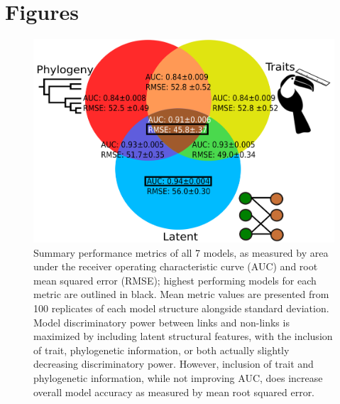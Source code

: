 \documentclass[openacc]{rsproca_new}%
\begin{document}
\section*{Figures}
\begin{figure}[!h]%
\centering
\includegraphics[width=\linewidth]{../Figs/ReplicatePerformance.png}
\caption{Summary performance metrics of all 7 models, as measured by area under the receiver operating characteristic curve (AUC) and root mean squared error (RMSE); highest performing models for each metric are outlined in black. Mean metric values are presented from 100 replicates of each model structure alongside standard deviation. Model discriminatory power between links and non-links is maximized by including latent structural features, with the inclusion of trait, phylogenetic information, or both actually slightly decreasing discriminatory power. However, inclusion of trait and phylogenetic information, while not improving AUC, does increase overall model accuracy as measured by mean root squared error.}
\label{fig:Figure_1}
\end{figure}


\clearpage 
\end{document}
